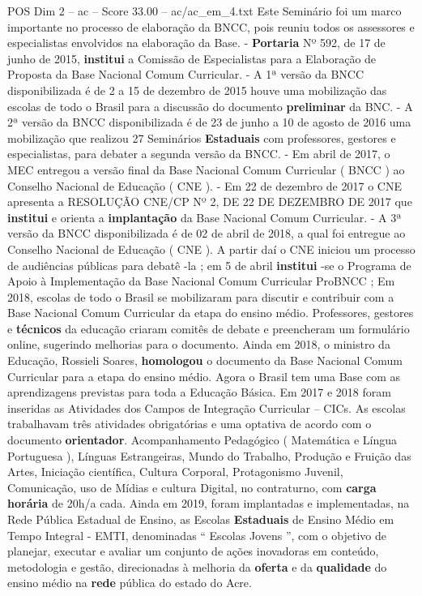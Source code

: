 \begin{textsample}{POS Dim 2 – ac – Score 33.00 – ac/ac\_em\_4.txt}
Este Seminário foi um marco importante no processo de elaboração da BNCC, pois reuniu todos os assessores e especialistas envolvidos na elaboração da Base. - \textbf{Portaria} Nº 592, de 17 de junho de 2015, \textbf{institui} a Comissão de Especialistas para a Elaboração de Proposta da Base Nacional Comum Curricular. - A 1ª versão da BNCC disponibilizada é de 2 a 15 de dezembro de 2015 houve uma mobilização das escolas de todo o Brasil para a discussão do documento \textbf{preliminar} da BNC. - A 2ª versão da BNCC disponibilizada é de 23 de junho a 10 de agosto de 2016 uma mobilização que realizou 27 Seminários \textbf{Estaduais} com professores, gestores e especialistas, para debater a segunda versão da BNCC. - Em abril de 2017, o MEC entregou a versão final da Base Nacional Comum Curricular ( BNCC ) ao Conselho Nacional de Educação ( CNE ). - Em 22 de dezembro de 2017 o CNE apresenta a RESOLUÇÃO CNE/CP Nº 2, DE 22 DE DEZEMBRO DE 2017 que \textbf{institui} e orienta a \textbf{implantação} da Base Nacional Comum Curricular. - A 3ª versão da BNCC disponibilizada é de 02 de abril de 2018, a qual foi entregue ao Conselho Nacional de Educação ( CNE ).
A partir daí o CNE iniciou um processo de audiências públicas para debatê -la ; em 5 de abril \textbf{institui} -se o Programa de Apoio à Implementação da Base Nacional Comum Curricular ProBNCC ; Em 2018, escolas de todo o Brasil se mobilizaram para discutir e contribuir com a Base Nacional Comum Curricular da etapa do ensino médio.
Professores, gestores e \textbf{técnicos} da educação criaram comitês de debate e preencheram um formulário online, sugerindo melhorias para o documento.
Ainda em 2018, o ministro da Educação, Rossieli Soares, \textbf{homologou} o documento da Base Nacional Comum Curricular para a etapa do ensino médio.
Agora o Brasil tem uma Base com as aprendizagens previstas para toda a Educação Básica.
Em 2017 e 2018 foram inseridas as Atividades dos Campos de Integração Curricular – CICs.
As escolas trabalhavam três atividades obrigatórias e uma optativa de acordo com o documento \textbf{orientador}.
Acompanhamento Pedagógico ( Matemática e Língua Portuguesa ), Línguas Estrangeiras, Mundo do Trabalho, Produção e Fruição das Artes, Iniciação científica, Cultura Corporal, Protagonismo Juvenil, Comunicação, uso de Mídias e cultura Digital, no contraturno, com \textbf{carga} \textbf{horária} de 20h/a cada.
Ainda em 2019, foram implantadas e implementadas, na Rede Pública Estadual de Ensino, as Escolas \textbf{Estaduais} de Ensino Médio em Tempo Integral - EMTI, denominadas “ Escolas Jovens ”, com o objetivo de planejar, executar e avaliar um conjunto de ações inovadoras em conteúdo, metodologia e gestão, direcionadas à melhoria da \textbf{oferta} e da \textbf{qualidade} do ensino médio na \textbf{rede} pública do estado do Acre.

\end{textsample}
